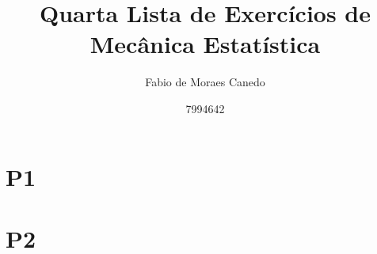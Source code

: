 \documentclass[a4paper,12pt]{article}
\title{Quarta Lista de Exercícios de Mecânica Estatística}
\author{Fabio de Moraes Canedo \and
7994642}
\begin{document}
\maketitle

%

%

\section{P1}



\newpage

\section{P2}





% 
%
%
\end{document}
